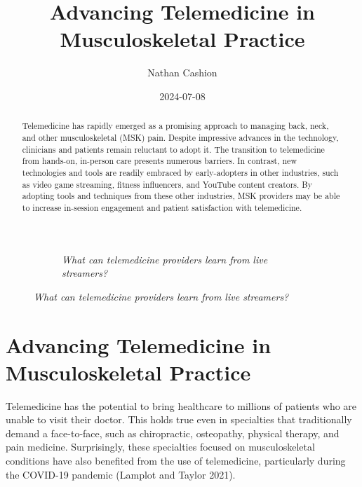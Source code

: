 \documentclass[
  letterpaper,
]{article}
\title{Advancing Telemedicine in Musculoskeletal Practice}
\author{Nathan Cashion}
\date{2024-07-08}
\makeatletter
\newcommand*\pandocbounded[1]{%
  \sbox\pandoc@box{#1}%
  \Gscale@div\@tempa{\textheight}{\dimexpr\ht\pandoc@box+\dp\pandoc@box\relax}%
  \Gscale@div\@tempb{\linewidth}{\wd\pandoc@box}%
  \ifdim\@tempb\p@<\@tempa\p@\let\@tempa\@tempb\fi%
  \ifdim\@tempa\p@<\p@\scalebox{\@tempa}{\usebox\pandoc@box}%
  \else\usebox{\pandoc@box}%
  \fi%
}
\renewcommand*\contentsname{Table of contents}
\newcommand\contentsname{Table of contents}
\makeatother
\begin{document}
\maketitle
\begin{abstract}
Telemedicine has rapidly emerged as a promising approach to managing
back, neck, and other musculoskeletal (MSK) pain. Despite impressive
advances in the technology, clinicians and patients remain reluctant to
adopt it. The transition to telemedicine from hands-on, in-person care
presents numerous barriers. In contrast, new technologies and tools are
readily embraced by early-adopters in other industries, such as video
game streaming, fitness influencers, and YouTube content creators. By
adopting tools and techniques from these other industries, MSK providers
may be able to increase in-session engagement and patient satisfaction
with telemedicine.
\end{abstract}

\renewcommand*\contentsname{Table of contents}
{
\hypersetup{linkcolor=}
\setcounter{tocdepth}{3}
\tableofcontents
}

\begin{figure}

\begin{figure}[H]

{\centering \pandocbounded{\texttt{[image: 3BroadcastSetup.png]}}

}

\caption{\emph{What can telemedicine providers learn from live
streamers?}}

\end{figure}%

\end{figure}%

\section{Advancing Telemedicine in Musculoskeletal
Practice}\label{advancing-telemedicine-in-musculoskeletal-practice}

Telemedicine has the potential to bring healthcare to millions of
patients who are unable to visit their doctor. This holds true even in
specialties that traditionally demand a face-to-face, such as
chiropractic, osteopathy, physical therapy, and pain medicine.
Surprisingly, these specialties focused on musculoskeletal conditions
have also benefited from the use of telemedicine, particularly during
the COVID-19 pandemic (Lamplot and Taylor 2021).
\end{document}

